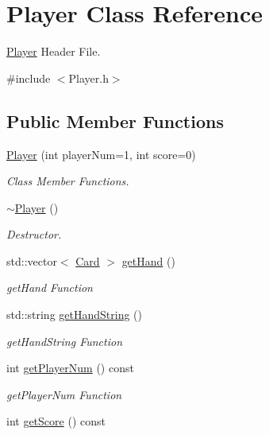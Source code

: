 \hypertarget{classPlayer}{\section{Player Class Reference}
\label{classPlayer}
}


\hyperlink{classPlayer}{Player} Header File.  




{\ttfamily \#include $<$Player.\-h$>$}

\subsection*{Public Member Functions}
\begin{DoxyCompactItemize}
\item 
\hyperlink{classPlayer_a3441fd8a55deac4d3fcf597eccbecd9b}{Player} (int player\-Num=1, int score=0)
\begin{DoxyCompactList}\small\item\em Class Member Functions. \end{DoxyCompactList}\item 
\hyperlink{classPlayer_a749d2c00e1fe0f5c2746f7505a58c062}{$\sim$\-Player} ()
\begin{DoxyCompactList}\small\item\em Destructor. \end{DoxyCompactList}\item 
std\-::vector$<$ \hyperlink{classCard}{Card} $>$ \hyperlink{classPlayer_a3dcd7c496f9bac6d656c773ff6e85efd}{get\-Hand} ()
\begin{DoxyCompactList}\small\item\em get\-Hand Function \end{DoxyCompactList}\item 
std\-::string \hyperlink{classPlayer_a776dfcce1da9e94a24de00332b987851}{get\-Hand\-String} ()
\begin{DoxyCompactList}\small\item\em get\-Hand\-String Function \end{DoxyCompactList}\item 
int \hyperlink{classPlayer_a70d53f7e54a6cb26533cd73bd2bf896a}{get\-Player\-Num} () const 
\begin{DoxyCompactList}\small\item\em get\-Player\-Num Function \end{DoxyCompactList}\item 
int \hyperlink{classPlayer_ac10eb9fb0387f565134958d129585ac6}{get\-Score} () const 

\end{DoxyCompactItemize}
